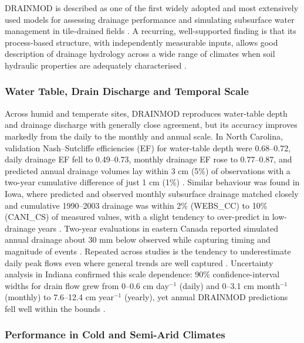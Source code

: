 \documentclass[11pt]{article}
\begin{document}
\textsc{DRAINMOD} is described as one of the first widely adopted and most extensively used models for assessing drainage performance and simulating subsurface water management in tile-drained fields \parencite{Singh2019b}. A recurring, well-supported finding is that its process-based structure, with independently measurable inputs, allows good description of drainage hydrology across a wide range of climates when soil hydraulic properties are adequately characterised \parencite{Gowda2012}.

\subsubsection{Water Table, Drain Discharge and Temporal Scale}

Across humid and temperate sites, \textsc{DRAINMOD} reproduces water-table depth and drainage discharge with generally close agreement, but its accuracy improves markedly from the daily to the monthly and annual scale. In North Carolina, validation Nash--Sutcliffe efficiencies (EF) for water-table depth were 0.68--0.72, daily drainage EF fell to 0.49--0.73, monthly drainage EF rose to 0.77--0.87, and predicted annual drainage volumes lay within 3 cm (5\%) of observations with a two-year cumulative difference of just 1 cm (1\%) \parencite{Gowda2012}. Similar behaviour was found in Iowa, where predicted and observed monthly subsurface drainage matched closely and cumulative 1990--2003 drainage was within 2\% (WEBS\_CC) to 10\% (CANI\_CS) of measured values, with a slight tendency to over-predict in low-drainage years \parencite{Singh2006b}. Two-year evaluations in eastern Canada reported simulated annual drainage about 30 mm below observed while capturing timing and magnitude of events \parencite{Dayyani2009}. Repeated across studies is the tendency to underestimate daily peak flows even where general trends are well captured \parencite{Morrison2014,Singh1996}. Uncertainty analysis in Indiana confirmed this scale dependence: 90\% confidence-interval widths for drain flow grew from 0--0.6 cm day$^{-1}$ (daily) and 0--3.1 cm month$^{-1}$ (monthly) to 7.6--12.4 cm year$^{-1}$ (yearly), yet annual DRAINMOD predictions fell well within the bounds \parencite{Wang2006}.

\subsubsection{Performance in Cold and Semi-Arid Climates}
\end{document}

